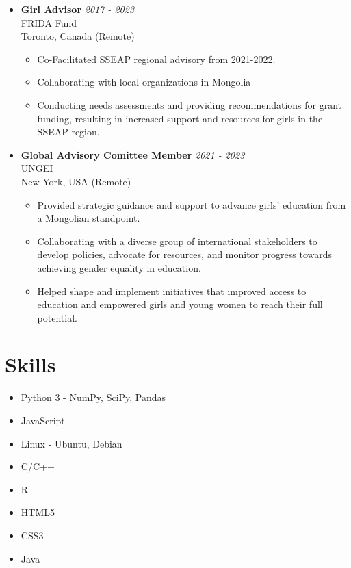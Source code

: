 \documentclass[11pt,a4paper]{article}
\begin{document}
\begin{itemize}
    \item \textbf{Girl Advisor} \hfill \textit{2017 - 2023} \\
    FRIDA Fund \\ 
    Toronto, Canada (Remote)
    \begin{itemize}
        \item Co-Facilitated SSEAP regional advisory from 2021-2022.
        \item Collaborating with local organizations in Mongolia
        \item Conducting needs assessments and providing recommendations for grant funding, resulting in increased support and resources for girls in the SSEAP region.
    \end{itemize}

    \item \textbf{Global Advisory Comittee Member} \hfill \textit{2021 - 2023} \\
    UNGEI \\
    New York, USA (Remote)
    \begin{itemize}
        \item Provided strategic guidance and support to advance girls' education from a Mongolian standpoint.
        \item Collaborating with a diverse group of international stakeholders to develop policies, advocate for resources, and monitor progress towards achieving gender equality in education.
        \item Helped shape and implement initiatives that improved access to education and empowered girls and young women to reach their full potential.
    \end{itemize}
\end{itemize}


\section*{Skills}

\begin{multicols}{2}
\begin{itemize}
    \item Python 3 - NumPy, SciPy, Pandas
    \item JavaScript
    \item Linux - Ubuntu, Debian
    \item C/C++
    \item R
    \item HTML5
    \item CSS3
    \item Java
\end{itemize}
\end{multicols}
\end{document}
